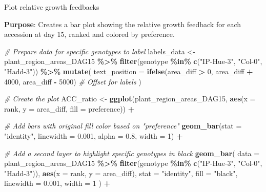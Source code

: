 \documentclass[
  11pt,
]{article}
\newenvironment{Shaded}{\begin{snugshade}}{\end{snugshade}}
\newcommand{\AttributeTok}[1]{\textcolor[rgb]{0.13,0.29,0.53}{#1}}
\newcommand{\CommentTok}[1]{\textcolor[rgb]{0.56,0.35,0.01}{\textit{#1}}}
\newcommand{\DecValTok}[1]{\textcolor[rgb]{0.00,0.00,0.81}{#1}}
\newcommand{\FloatTok}[1]{\textcolor[rgb]{0.00,0.00,0.81}{#1}}
\newcommand{\FunctionTok}[1]{\textcolor[rgb]{0.13,0.29,0.53}{\textbf{#1}}}
\newcommand{\NormalTok}[1]{#1}
\newcommand{\OtherTok}[1]{\textcolor[rgb]{0.56,0.35,0.01}{#1}}
\newcommand{\SpecialCharTok}[1]{\textcolor[rgb]{0.81,0.36,0.00}{\textbf{#1}}}
\newcommand{\StringTok}[1]{\textcolor[rgb]{0.31,0.60,0.02}{#1}}
\begin{document}
Plot relative growth feedbacks

\textbf{Purpose}: Creates a bar plot showing the relative growth
feedback for each accession at day 15, ranked and colored by preference.

\begin{Shaded}
\begin{Highlighting}[]
\CommentTok{\# Prepare data for specific genotypes to label}
\NormalTok{labels\_data }\OtherTok{\textless{}{-}}\NormalTok{ plant\_region\_areas\_DAG15 }\SpecialCharTok{\%\textgreater{}\%}
  \FunctionTok{filter}\NormalTok{(genotype }\SpecialCharTok{\%in\%} \FunctionTok{c}\NormalTok{(}\StringTok{"IP{-}Hue{-}3"}\NormalTok{, }\StringTok{"Col{-}0"}\NormalTok{, }\StringTok{"Hadd{-}3"}\NormalTok{)) }\SpecialCharTok{\%\textgreater{}\%}
  \FunctionTok{mutate}\NormalTok{(}
    \AttributeTok{text\_position =} \FunctionTok{ifelse}\NormalTok{(area\_diff }\SpecialCharTok{\textgreater{}} \DecValTok{0}\NormalTok{, area\_diff }\SpecialCharTok{+} \DecValTok{4000}\NormalTok{, area\_diff }\SpecialCharTok{{-}} \DecValTok{5000}\NormalTok{) }\CommentTok{\# Offset for labels}
\NormalTok{  )}

\CommentTok{\# Create the plot}
\NormalTok{ACC\_ratio }\OtherTok{\textless{}{-}} \FunctionTok{ggplot}\NormalTok{(plant\_region\_areas\_DAG15, }\FunctionTok{aes}\NormalTok{(}\AttributeTok{x =}\NormalTok{ rank, }\AttributeTok{y =}\NormalTok{ area\_diff, }\AttributeTok{fill =}\NormalTok{ preference)) }\SpecialCharTok{+}
  
  \CommentTok{\# Add bars with original fill color based on "preference"}
  \FunctionTok{geom\_bar}\NormalTok{(}\AttributeTok{stat =} \StringTok{"identity"}\NormalTok{, }\AttributeTok{linewidth =} \FloatTok{0.001}\NormalTok{, }\AttributeTok{alpha =} \FloatTok{0.8}\NormalTok{, }\AttributeTok{width =} \DecValTok{1}\NormalTok{) }\SpecialCharTok{+}
  
  \CommentTok{\# Add a second layer to highlight specific genotypes in black}
  \FunctionTok{geom\_bar}\NormalTok{(}
    \AttributeTok{data =}\NormalTok{ plant\_region\_areas\_DAG15 }\SpecialCharTok{\%\textgreater{}\%} \FunctionTok{filter}\NormalTok{(genotype }\SpecialCharTok{\%in\%} \FunctionTok{c}\NormalTok{(}\StringTok{"IP{-}Hue{-}3"}\NormalTok{, }\StringTok{"Col{-}0"}\NormalTok{, }\StringTok{"Hadd{-}3"}\NormalTok{)),}
    \FunctionTok{aes}\NormalTok{(}\AttributeTok{x =}\NormalTok{ rank, }\AttributeTok{y =}\NormalTok{ area\_diff),}
    \AttributeTok{stat =} \StringTok{"identity"}\NormalTok{, }\AttributeTok{fill =} \StringTok{"black"}\NormalTok{, }\AttributeTok{linewidth =} \FloatTok{0.001}\NormalTok{, }\AttributeTok{width =} \DecValTok{1}
\NormalTok{  ) }\SpecialCharTok{+}
  

\end{Highlighting}
\end{Shaded}
\end{document}
